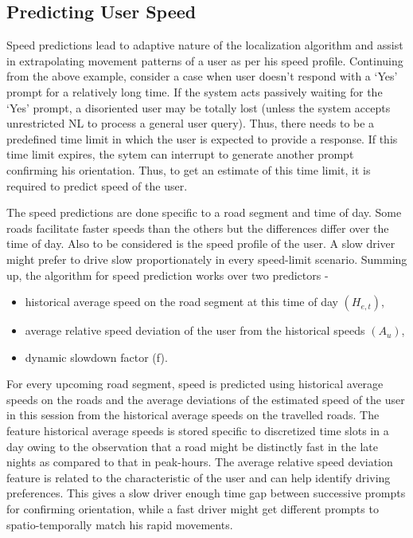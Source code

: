 \documentclass{iitkthesis}
\begin{document}
\subsection{Predicting User Speed}
Speed predictions lead to adaptive nature of the localization algorithm and assist in extrapolating movement patterns of a user as per his speed profile. Continuing from the above example, consider a case when user doesn't respond with a `Yes' prompt for a relatively long time. If the system acts passively waiting for the `Yes' prompt, a disoriented user may be totally lost (unless the system accepts unrestricted NL to process a general user query). Thus, there needs to be a predefined time limit in which the user is expected to provide a response. If this time limit expires, the sytem can interrupt to generate another prompt confirming his orientation. Thus, to get an estimate of this time limit, it is required to predict speed of the user. 

The speed predictions are done specific to a road segment and time of day. Some roads facilitate faster speeds than the others but the differences differ over the time of day.
Also to be considered is the speed profile of the user. A slow driver might prefer to drive slow proportionately in every speed-limit scenario. Summing up, the algorithm for speed prediction works over two predictors - 
\begin{itemize}
\item historical average speed on the road segment at this time of day $(H_{e,t})$,
\item average relative speed deviation of the user from the historical speeds $({A_u})$,
\item dynamic slowdown factor (f).
\end{itemize}

For every upcoming road segment, speed is predicted using historical average speeds on the roads and the average deviations of the estimated speed of the user in this session from the historical average speeds on the travelled roads. The feature historical average speeds is stored specific to discretized time slots in a day owing to the observation that a road might be distinctly fast in the late nights as compared to that in peak-hours. The average relative speed deviation feature is related to the characteristic of the user and can help identify driving preferences. This gives a slow driver enough time gap between successive prompts for confirming orientation, while a fast driver might get different prompts to spatio-temporally match his rapid movements.  
\end{document}
